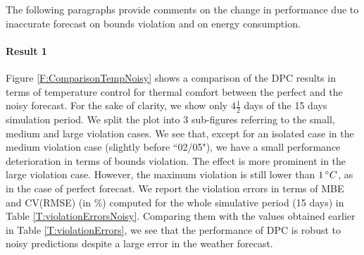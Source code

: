 \textcolor[rgb]{0,0,1}{The following paragraphs provide comments on the change in performance due to inaccurate forecast on bounds violation and on energy consumption.\\
\paragraph{Result 1} Figure \ref{F:ComparisonTempNoisy} shows a comparison of the DPC results in terms of temperature control for thermal comfort between the perfect and the noisy forecast.
For the sake of clarity, we show only \(4\frac{1}{2}\) days of the 15 days simulation period. We split the plot into 3 sub-figures referring to the small, medium and large violation cases.
We see that, except for an isolated case in the medium violation case (slightly before ``02/05"), we have a small performance deterioration in terms of bounds violation. The effect is more prominent in the large violation case.
However, the maximum violation is still lower than $1\,\degree C$, as in the case of perfect forecast.
We report the violation errors in terms of MBE and CV(RMSE) (in $\%$) computed for the whole simulative period (15 days) in Table \ref{T:violationErrorsNoisy}.
Comparing them with the values obtained earlier in Table \ref{T:violationErrors}, we see that the performance of DPC is robust to noisy predictions despite a large error in the weather forecast.
}
